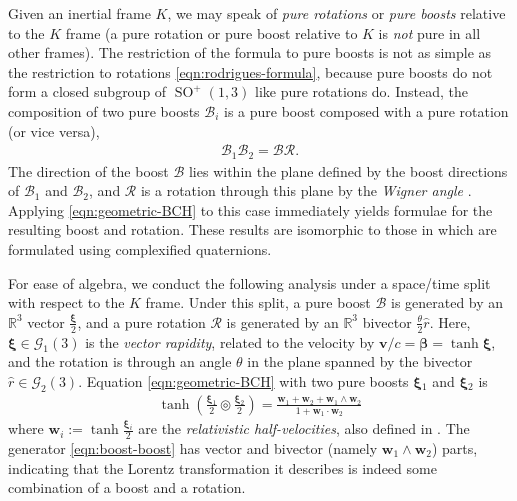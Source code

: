 \documentclass[12pt,a4paper]{article}
\makeatletter
\newcommand\x[1]{\@nameuse{\detokenize{#1}}}
\renewcommand{\vb}[1]{\boldsymbol{#1}}
\newcommand{\GA}[1][]{\mathcal{G}_{#1}}
\newcommand{\rotor}[1]{\mathcal{#1}}
\newcommand{\RR}{\mathds{R}}
\DeclareMathOperator{\SO}{SO}
\newcommand{\bch}[2]{#1 \circledcirc #2}
\makeatother
\begin{document}
Given an inertial frame $K$, we may speak of \emph{pure rotations} or \emph{pure boosts} relative to the $K$ frame (a pure rotation or pure boost relative to $K$ is \emph{not} pure in all other frames).
The restriction of the \x{BCH} formula to pure boosts is not as simple as the restriction to rotations \eqref{eqn:rodrigues-formula}, because pure boosts do not form a closed subgroup of $\SO^+(1,3)$ like pure rotations do.
Instead, the composition of two pure boosts $\rotor B_i$ is a pure boost composed with a pure rotation (or vice versa),
\begin{align}
	\rotor B_1\rotor B_2 = \rotor B\rotor R
	\label{eqn:boost-boost-makes-boost-rotation}
.\end{align}
The direction of the boost $\rotor B$ lies within the plane defined by the boost directions of $\rotor B_1$ and $\rotor B_2$, and $\rotor R$ is a rotation through this plane by the \emph{Wigner angle} \cite{visser2011sr-velocity-composition}.
Applying \eqref{eqn:geometric-BCH} to this case immediately yields formulae for the resulting boost and rotation.
These results are isomorphic to those in \cite{berry2020quat-sr} which are formulated using complexified quaternions.


For ease of algebra, we conduct the following analysis under a space/time split with respect to the $K$ frame.
Under this split, a pure boost $\rotor B$ is generated by an $\RR^3$ vector $\frac{\vb \xi{}}{2}$, and a pure rotation $\rotor R$ is generated by an $\RR^3$ bivector $\frac\theta2\hat{r}$.
Here, $\vb \xi{} \in{} \GA[1](3)$ is the \emph{vector rapidity}, related to the velocity by $\vb v/c = \vb \beta{} = \tanh \vb \xi{}$, and the rotation is through an angle $\theta$ in the plane spanned by the bivector $\hat{r} \in{} \GA[2](3)$.
Equation \eqref{eqn:geometric-BCH} with two pure boosts $\vb \xi{}_1$ and $\vb \xi{}_2$ is
\begin{align}
	\tanh(\bch{\frac{\vb \xi{}_1}{2}}{\frac{\vb \xi{}_2}{2}})
	= \frac{\vb{w}{}_1 + \vb{w}{}_2 + \vb{w}{}_1 \wedge{} \vb{w}{}_2}{1 + \vb{w}{}_1\cdot{}\vb{w}{}_2}
	\label{eqn:boost-boost}
\end{align}
where $\vb{w}{}_i :={} \tanh\frac{\vb \xi{}_i}{2}$ are the \emph{relativistic half-velocities}, also defined in \cite{berry2020quat-sr,berry2021quat-sr}.
The generator \eqref{eqn:boost-boost} has vector and bivector (namely $\vb{w}{}_1 \wedge{} \vb{w}{}_2$) parts, indicating that the Lorentz transformation it describes is indeed some combination of a boost and a rotation.
\end{document}
